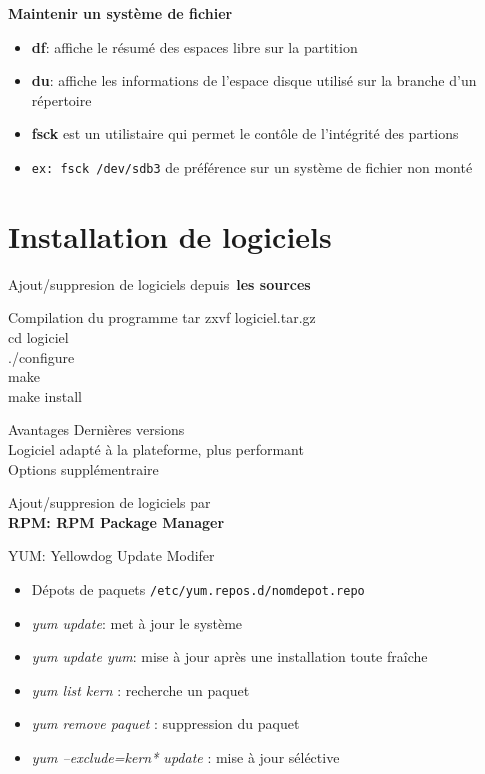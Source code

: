 \documentclass[french]{beamer}
\begin{document}
\begin{frame}
\textbf{Maintenir un système de fichier}
\begin{itemize}
\item \textbf{df}: affiche le résumé des espaces libre sur la partition
\item \textbf{du}: affiche les informations de l'espace disque utilisé sur la
branche d'un répertoire
\item \textbf{fsck} est un utilistaire qui permet le contôle de l'intégrité des
partions
\item \texttt{ex: fsck /dev/sdb3} de préférence sur un système de fichier non
monté
\end{itemize}
\end{frame}

\section{Installation de logiciels}
\begin{frame}
Ajout/suppresion de logiciels depuis\
\textbf{les sources}
\begin{block}{Compilation du programme}
tar zxvf logiciel.tar.gz\\
cd logiciel\\
./configure\\
make\\
make install\\
\end{block}
\begin{block}{Avantages}
Dernières versions\\
Logiciel adapté à la plateforme, plus performant\\
Options supplémentraire\\
\end{block}
\end{frame}


\begin{frame}
\begin{center}
Ajout/suppresion de logiciels par\\
\textbf{RPM: RPM Package Manager }
\end{center}
\begin{block}{YUM: Yellowdog Update Modifer}
\begin{itemize}
\item Dépots de paquets \texttt{/etc/yum.repos.d/nomdepot.repo}
\item \textit{yum update}: met à jour le système 
\item \textit{yum update yum}: mise à jour après une installation toute fraîche
\item \textit{yum list kern\*} : recherche un paquet 
\item \textit{yum remove paquet} : suppression du paquet
\item \textit{yum --exclude=kern* update} : mise à jour séléctive
\end{itemize}
\end{block}
\end{frame}
\end{document}
